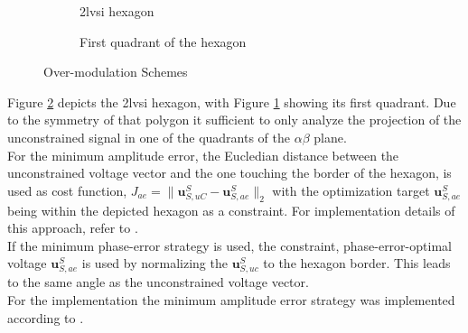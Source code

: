 \begin{figure}
	\centering
		\begin{subfigure}[b]{0.4\textwidth}
		
		\caption{\acrshort{2lvsi} hexagon}
	\end{subfigure}
	\hspace{0.05\textwidth}
	\begin{subfigure}[b]{0.4\textwidth}
		
		\caption{First quadrant of the hexagon}
        \label{fig:2_qua1_hex}
	\end{subfigure}
	\caption{Over-modulation Schemes}
	\label{fig:2_overmod}
\end{figure}
Figure \ref{fig:2_overmod} depicts the \acrshort{2lvsi} hexagon, with Figure \ref{fig:2_qua1_hex} showing its first quadrant. Due to the symmetry of that polygon it sufficient to only analyze the projection of the unconstrained signal in one of the quadrants of the $\alpha \beta$ plane. \\
For the minimum amplitude error, the Eucledian distance between the unconstrained voltage vector and the one touching the border of the hexagon, is used as cost function, 
$J_{ae} = \| \bm{u}_{S,uC}^S - \bm{u}_{S,ae}^S \|_2$ with the optimization  target $\bm{u}_{S,ae}^S$  being within the depicted hexagon as a constraint. For implementation details of this approach, refer to \cite{NeunerMA}.\\
If the minimum phase-error strategy is used, the constraint, phase-error-optimal voltage $ \bm{u}_{S,ae}^S$ is used by normalizing the $ \bm{u}_{S,uc}^S$ to the hexagon border. This leads to the same angle as the unconstrained voltage vector.\\
For the implementation the minimum amplitude error strategy was implemented according to \cite{NeunerMA}.

